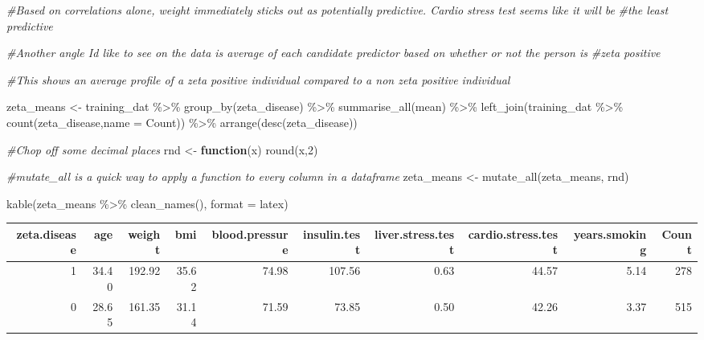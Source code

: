 \documentclass[
]{article}
\newenvironment{Shaded}{\begin{snugshade}}{\end{snugshade}}
\newcommand{\AttributeTok}[1]{\textcolor[rgb]{0.77,0.63,0.00}{#1}}
\newcommand{\CommentTok}[1]{\textcolor[rgb]{0.56,0.35,0.01}{\textit{#1}}}
\newcommand{\ControlFlowTok}[1]{\textcolor[rgb]{0.13,0.29,0.53}{\textbf{#1}}}
\newcommand{\DecValTok}[1]{\textcolor[rgb]{0.00,0.00,0.81}{#1}}
\newcommand{\FunctionTok}[1]{\textcolor[rgb]{0.00,0.00,0.00}{#1}}
\newcommand{\NormalTok}[1]{#1}
\newcommand{\OtherTok}[1]{\textcolor[rgb]{0.56,0.35,0.01}{#1}}
\newcommand{\SpecialCharTok}[1]{\textcolor[rgb]{0.00,0.00,0.00}{#1}}
\newcommand{\StringTok}[1]{\textcolor[rgb]{0.31,0.60,0.02}{#1}}
\begin{document}
\begin{Shaded}
\begin{Highlighting}[]
\CommentTok{\#Based on correlations alone, weight immediately sticks out as potentially predictive. Cardio stress test seems like it will be}
\CommentTok{\#the least predictive}


\CommentTok{\#Another angle I\textquotesingle{}d like to see on the data is average of each candidate predictor based on whether or not the person is}
\CommentTok{\#zeta positive}

\CommentTok{\#This shows an average profile of a zeta positive individual compared to a non zeta positive individual}

\NormalTok{zeta\_means }\OtherTok{\textless{}{-}}\NormalTok{ training\_dat }\SpecialCharTok{\%\textgreater{}\%}
  \FunctionTok{group\_by}\NormalTok{(zeta\_disease) }\SpecialCharTok{\%\textgreater{}\%}
  \FunctionTok{summarise\_all}\NormalTok{(mean) }\SpecialCharTok{\%\textgreater{}\%} 
  \FunctionTok{left\_join}\NormalTok{(training\_dat }\SpecialCharTok{\%\textgreater{}\%} \FunctionTok{count}\NormalTok{(zeta\_disease,}\AttributeTok{name =} \StringTok{\textquotesingle{}Count\textquotesingle{}}\NormalTok{)) }\SpecialCharTok{\%\textgreater{}\%}
  \FunctionTok{arrange}\NormalTok{(}\FunctionTok{desc}\NormalTok{(zeta\_disease))}


\CommentTok{\#Chop off some decimal places}
\NormalTok{rnd }\OtherTok{\textless{}{-}} \ControlFlowTok{function}\NormalTok{(x) }\FunctionTok{round}\NormalTok{(x,}\DecValTok{2}\NormalTok{)}

\CommentTok{\#mutate\_all is a quick way to apply a function to every column in a dataframe}
\NormalTok{zeta\_means }\OtherTok{\textless{}{-}} \FunctionTok{mutate\_all}\NormalTok{(zeta\_means, rnd)}

\FunctionTok{kable}\NormalTok{(zeta\_means }\SpecialCharTok{\%\textgreater{}\%} \FunctionTok{clean\_names}\NormalTok{(), }\AttributeTok{format =} \StringTok{\textquotesingle{}latex\textquotesingle{}}\NormalTok{) }
\end{Highlighting}
\end{Shaded}

\begin{tabular}{r|r|r|r|r|r|r|r|r|r}
\hline
zeta.disease & age & weight & bmi & blood.pressure & insulin.test & liver.stress.test & cardio.stress.test & years.smoking & Count\\
\hline
1 & 34.40 & 192.92 & 35.62 & 74.98 & 107.56 & 0.63 & 44.57 & 5.14 & 278\\
\hline
0 & 28.65 & 161.35 & 31.14 & 71.59 & 73.85 & 0.50 & 42.26 & 3.37 & 515\\
\hline
\end{tabular}
\end{document}
